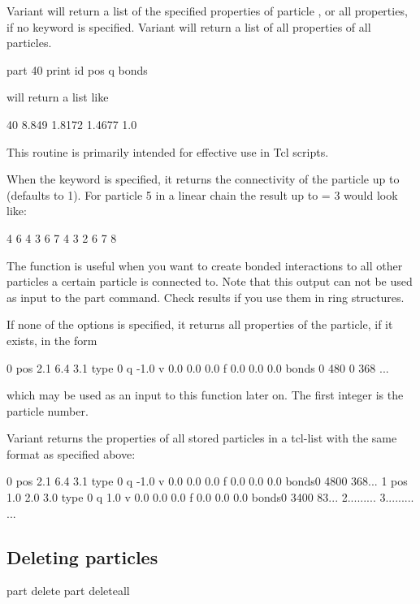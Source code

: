 Variant  will return a list of the specified properties of
particle , or all properties, if no keyword is
specified.  Variant  will return a list of all properties
of all particles.

\begin{code}
part 40 print id pos q bonds
\end{code}
will return a list like
\begin{tclcode}
40 8.849 1.8172 1.4677 1.0 {}
\end{tclcode}
This routine is primarily intended for effective use in Tcl scripts.

When the keyword  is specified, it returns the
connectivity of the particle up to  (defaults to 1). For
particle 5 in a linear chain the result up to  = 3 would
look like:
\begin{tclcode}
{ { 4 } { 6 } } { { 4 3 } { 6 7 } } { {4 3 2 } { 6 7 8 } } 
\end{tclcode}
The function is useful when you want to create bonded interactions to
all other particles a certain particle is connected to. Note that this
output can not be used as input to the part command. Check results if
you use them in ring structures.

If none of the options is specified, it returns all properties of the
particle, if it exists, in the form
\begin{tclcode}
  0 pos 2.1 6.4 3.1 type 0 q -1.0 v 0.0 0.0 0.0 f 0.0 0.0 0.0
  bonds { {0 480} {0 368} ... } 
\end{tclcode}
which may be used as an input to this function later on. The first
integer is the particle number.

Variant  returns the properties of all stored particles in
a tcl-list with the same format as specified above:
\begin{tclcode}
{0 pos 2.1 6.4 3.1 type 0 q -1.0 v 0.0 0.0 0.0 f 0.0 0.0 0.0
 bonds{{0 480}{0 368}...}} 
{1 pos 1.0 2.0 3.0 type 0 q 1.0 v 0.0 0.0 0.0 f 0.0 0.0 0.0
 bonds{{0 340}{0 83}...}} 
{2...{{...}...}}
{3...{{...}...}}
...
\end{tclcode}

\subsection{Deleting  particles}
\label{tcl:part:delete}

\begin{essyntax}
   part  delete
   part deleteall
\end{essyntax}

